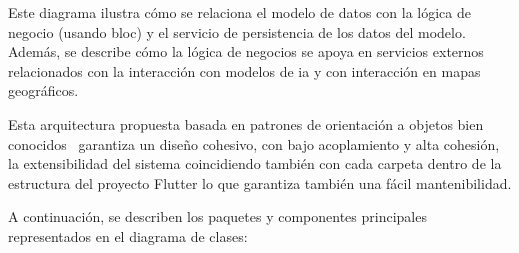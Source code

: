 
Este diagrama ilustra cómo se relaciona el modelo de datos con la lógica de negocio (usando \acrshort{bloc}) y el servicio de persistencia de los datos del modelo. Además, se describe cómo la lógica de negocios se apoya en servicios externos relacionados con la interacción con modelos de \acrshort{ia} y con interacción en mapas geográficos.

Esta arquitectura propuesta basada en patrones de orientación a objetos bien conocidos~\cite{gamma2002patrones} garantiza un diseño cohesivo, con bajo acoplamiento y alta cohesión, la extensibilidad del sistema coincidiendo también con cada carpeta dentro de la estructura del proyecto Flutter lo que garantiza también una fácil mantenibilidad.

A continuación, se describen los paquetes y componentes principales representados en el diagrama de clases:

